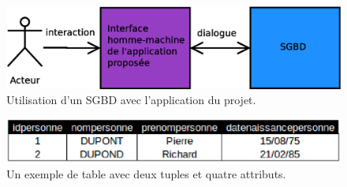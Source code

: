 \begin{figure}[!h]
  \centering
  \includegraphics[width=14cm]{images/avec_idb.eps}
  \caption{Utilisation d'un SGBD avec l'application du projet.}
  \label{avec_idb_schema}
\end{figure}

\begin{figure}[!h]
  \centering
  \includegraphics[width=14cm]{images/exemple_table.eps}
  \caption{Un exemple de table avec deux tuples et quatre attributs.}
  \label{exemple_table}
\end{figure}
